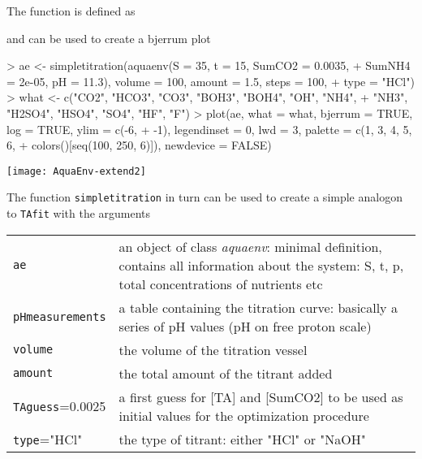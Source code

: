 \documentclass[article,nojss]{jss}
\begin{document}
The function is defined as
\begin{scriptsize}
\begin{Schunk}
\end{Schunk}
\end{scriptsize}

and can be used to create a bjerrum plot 
\begin{Schunk}
\begin{Sinput}
> ae <- simpletitration(aquaenv(S = 35, t = 15, SumCO2 = 0.0035, 
+     SumNH4 = 2e-05, pH = 11.3), volume = 100, amount = 1.5, steps = 100, 
+     type = "HCl")
> what <- c("CO2", "HCO3", "CO3", "BOH3", "BOH4", "OH", "NH4", 
+     "NH3", "H2SO4", "HSO4", "SO4", "HF", "F")
> plot(ae, what = what, bjerrum = TRUE, log = TRUE, ylim = c(-6, 
+     -1), legendinset = 0, lwd = 3, palette = c(1, 3, 4, 5, 6, 
+     colors()[seq(100, 250, 6)]), newdevice = FALSE)
\end{Sinput}
\end{Schunk}
\texttt{[image: AquaEnv-extend2]}

The function \texttt{simpletitration} in turn can be used to create a simple analogon to \texttt{TAfit} with the arguments\\
\begin{tabular}{lp{}}
\texttt{ae} & an object of class \textit{aquaenv}: minimal definition, contains all information about the system: S, t, p, total concentrations of nutrients etc \\
\texttt{pHmeasurements} & a table containing the titration curve: basically a series of pH values (pH on free proton scale)\\
\texttt{volume} & the volume of the titration vessel\\
\texttt{amount} & the total amount of the titrant added\\
\texttt{TAguess}=0.0025 & a first guess for [TA] and [SumCO2] to be used as initial values for the optimization procedure\\
\texttt{type}="HCl"& the type of titrant: either "HCl" or "NaOH"\\
\end{tabular}\\
\end{document}
